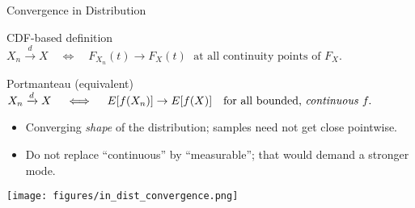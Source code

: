 \documentclass{beamer}
\def\E{E}%
\def\mathbb#1{#1}%
\def\mathcal#1{#1}%
\newcommand{\E}{\mathbb{E}}
\newcommand{\1}{\mathbf{1}}
\newcommand{\tod}{\xrightarrow{\,\mathcal{D}\,}}
\begin{document}
\begin{frame}{Convergence in Distribution}
  \footnotesize
  \begin{block}{CDF-based definition}
    \centering
    $ X_n \xrightarrow{d} X \quad \iff \quad F_{X_n}(t) \to F_X(t) \; \text{ at all continuity points of } F_X. $
  \end{block}
  \begin{block}{Portmanteau (equivalent)}
    \centering
    $ X_n \xrightarrow{d} X \quad \iff \quad \E[f(X_n)] \to \E[f(X)] \quad \text{for all bounded, \emph{continuous} } f. $
  \end{block}
  \begin{itemize}
    \item Converging \emph{shape} of the distribution; samples need not get close pointwise.
    \item Do not replace ``continuous'' by ``measurable''; that would demand a stronger mode.
  \end{itemize}
  \begin{center}
    \texttt{[image: figures/in\_dist\_convergence.png]}
  \end{center}
\end{frame}
\end{document}
